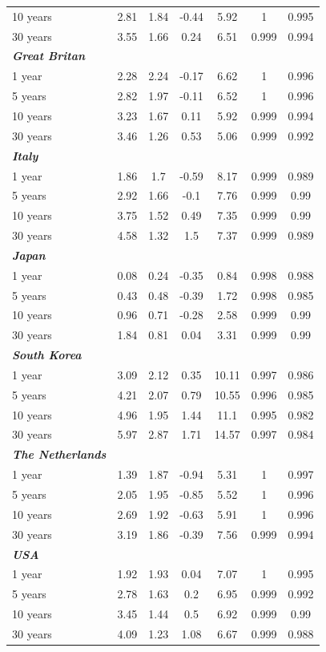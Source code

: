 \documentclass[12pt,bibliography=totoc]{article}
\begin{document}
\begin{appendices}
\begin{table}[H]
\begin{tabular}{l c c c c c c}
10 years & 2.81 & 1.84 & -0.44 & 5.92 & 1 & 0.995\\
30 years & 3.55 & 1.66 & 0.24 & 6.51 & 0.999 & 0.994\\
\textit{\textbf{Great Britan}} & & & & & & \\
1 year & 2.28 & 2.24 & -0.17 & 6.62 & 1 & 0.996\\
5 years & 2.82 & 1.97 & -0.11 & 6.52 & 1 & 0.996\\
10 years & 3.23 & 1.67 & 0.11 & 5.92 & 0.999 & 0.994\\
30 years & 3.46 & 1.26 & 0.53 & 5.06 & 0.999 & 0.992\\
\textit{\textbf{Italy}} & & & & & & \\
1 year & 1.86 & 1.7 & -0.59 & 8.17 & 0.999 & 0.989\\
5 years & 2.92 & 1.66 & -0.1 & 7.76 & 0.999 & 0.99\\
10 years & 3.75 & 1.52 & 0.49 & 7.35 & 0.999 & 0.99\\
30 years & 4.58 & 1.32 & 1.5 & 7.37 & 0.999 & 0.989\\
\textit{\textbf{Japan}} & & & & & & \\
1 year & 0.08 & 0.24 & -0.35 & 0.84 & 0.998 & 0.988\\
5 years & 0.43 & 0.48 & -0.39 & 1.72 & 0.998 & 0.985\\
10 years & 0.96 & 0.71 & -0.28 & 2.58 & 0.999 & 0.99\\
30 years & 1.84 & 0.81 & 0.04 & 3.31 & 0.999 & 0.99\\
\textit{\textbf{South Korea}} & & & & & & \\
1 year & 3.09 & 2.12 & 0.35 & 10.11 & 0.997 & 0.986\\
5 years & 4.21 & 2.07 & 0.79 & 10.55 & 0.996 & 0.985\\
10 years & 4.96 & 1.95 & 1.44 & 11.1 & 0.995 & 0.982\\
30 years & 5.97 & 2.87 & 1.71 & 14.57 & 0.997 & 0.984\\
\textit{\textbf{The Netherlands}} & & & & & & \\
1 year & 1.39 & 1.87 & -0.94 & 5.31 & 1 & 0.997\\
5 years & 2.05 & 1.95 & -0.85 & 5.52 & 1 & 0.996\\
10 years & 2.69 & 1.92 & -0.63 & 5.91 & 1 & 0.996\\
30 years & 3.19 & 1.86 & -0.39 & 7.56 & 0.999 & 0.994\\
\textit{\textbf{USA}} & & & & & & \\
1 year & 1.92 & 1.93 & 0.04 & 7.07 & 1 & 0.995\\
5 years & 2.78 & 1.63 & 0.2 & 6.95 & 0.999 & 0.992\\
10 years & 3.45 & 1.44 & 0.5 & 6.92 & 0.999 & 0.99\\
30 years & 4.09 & 1.23 & 1.08 & 6.67 & 0.999 & 0.988\\



\end{tabular}
\end{table}
\end{appendices}
\end{document}
